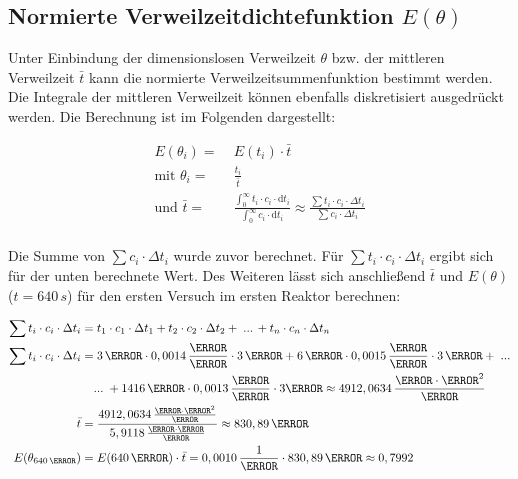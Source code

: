 \documentclass[12pt,liststotoc]{report}
\begin{document}
\subsection{Normierte Verweilzeitdichtefunktion $E(\theta)$}

Unter Einbindung der dimensionslosen Verweilzeit $\theta$ bzw. der mittleren Verweilzeit $\bar{t}$ kann die normierte Verweilzeitsummenfunktion bestimmt werden. Die Integrale der mittleren Verweilzeit können ebenfalls diskretisiert ausgedrückt werden. Die Berechnung ist im Folgenden dargestellt:

\begin{align}
E(\theta_i) =&\; E(t_i) \cdot \bar{t} \\
\text{mit }\theta_i=&\;\frac{t_i}{\bar{t}}\\
\text{und }\bar{t} = &\;\frac{\int_{0}^{\infty}t_i\cdot c_i \cdot\text{d}t_i}{\int_{0}^{\infty}c_i \cdot\text{d}t_i} \approx \frac{\sum t_i\cdot c_i \cdot \Delta t_i}{\sum c_i \cdot \Delta t_i}\\ 
\end{align} 

Die Summe von $\sum c_i \cdot \Delta t_i$ wurde zuvor berechnet. Für $\sum t_i\cdot c_i \cdot \Delta t_i$ ergibt sich für der unten berechnete Wert. Des Weiteren lässt sich anschließend $\bar{t}$ und $E(\theta)$ ($t= 640\,s$) für den ersten Versuch im ersten Reaktor berechnen:

\begin{align*}
\sum t_i\cdot c_i \cdot \Delta t_i =&\;t_1\cdot c_1 \cdot \Delta t_1 + t_2\cdot c_2 \cdot \Delta t_2+\;...\,+t_n\cdot c_n \cdot \Delta t_n \\
\sum t_i\cdot c_i \cdot \Delta t_i =&\; 3\,\s\cdot 0,0014\,\frac{\mole}{\litre}\cdot 3\,\s + 6\,\s\cdot 0,0015\,\frac{\mole}{\litre}\cdot 3\,\s+\;...\\
&...\;+ 1416\,\s\cdot 0,0013\,\frac{\mole}{\litre}\cdot 3\s \approx 4912,0634\,\frac{\mole\cdot\s^2}{\litre}\\
\bar{t} =&\; \frac{4912,0634\,\frac{\mole\cdot\s^2}{\litre}}{5,9118\,\frac{\mole\cdot\s}{\litre}} \approx 830,89\,\s\\
E(\theta_{640\,\s}) =&\; E(640\,\s)\cdot\bar{t} = 0,0010\,\frac{1}{\s} \cdot 830,89\,\s \approx 0,7992\\
\end{align*} 
\end{document}
